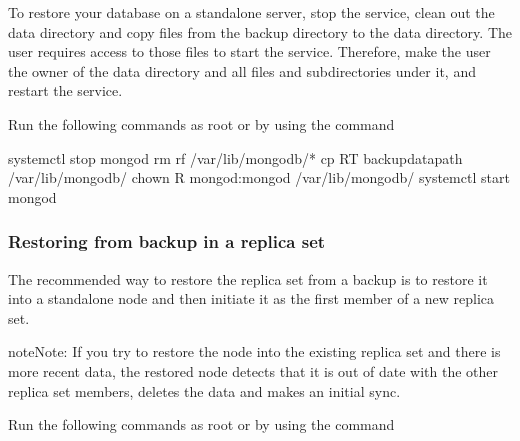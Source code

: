 \documentclass[letterpaper,10pt,english]{sphinxmanual}
\begin{document}
\sphinxAtStartPar
To restore your database on a standalone server, stop the  service, clean out the data directory and copy files from the backup directory to the data directory. The  user requires access to those files to start the service. Therefore, make the  user the owner of the data directory and all files and subdirectories under it, and restart the  service.

\sphinxAtStartPar
Run the following commands as root or by using the  command

\begin{sphinxVerbatim}[commandchars=\\\{\}]
\PYGZdl{} systemctl stop mongod
\PYGZdl{} rm \PYGZhy{}rf /var/lib/mongodb/*
\PYGZdl{} cp \PYGZhy{}RT \PYGZlt{}backup\PYGZus{}data\PYGZus{}path\PYGZgt{} /var/lib/mongodb/
\PYGZdl{} chown \PYGZhy{}R mongod:mongod /var/lib/mongodb/
\PYGZdl{} systemctl start mongod
\end{sphinxVerbatim}
\subsubsection*{Restoring from backup in a replica set}

\sphinxAtStartPar
The recommended way to restore the replica set from a backup is to restore it into a standalone node and then initiate it as the first member of a new replica set.

\begin{sphinxadmonition}{note}{Note:}
\sphinxAtStartPar
If you try to restore the node into the existing replica set and there is more recent data, the restored node detects that it is out of date with the other replica set members, deletes the data and makes an initial sync.
\end{sphinxadmonition}

\sphinxAtStartPar
Run the following commands as root or by using the  command
\end{document}
